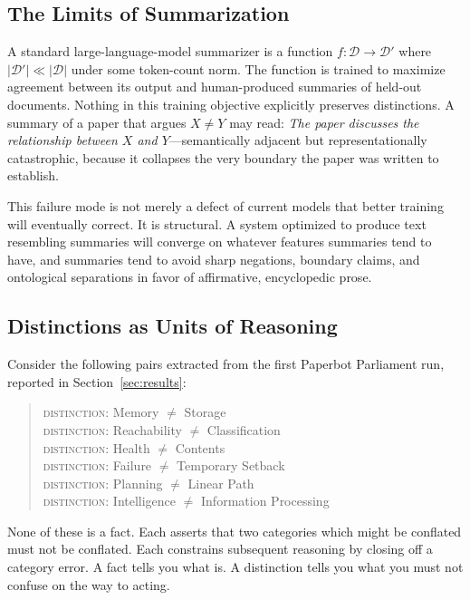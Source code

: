 \documentclass[12pt, a4paper]{article}
\theoremstyle{principle}
\theoremstyle{definition}
\begin{document}
\subsection{The Limits of Summarization}

A standard large-language-model summarizer is a function $f : \mathcal{D} \to
\mathcal{D}'$ where $|\mathcal{D}'| \ll |\mathcal{D}|$ under some token-count norm.
The function is trained to maximize agreement between its output and human-produced
summaries of held-out documents. Nothing in this training objective explicitly
preserves distinctions. A summary of a paper that argues $X \neq Y$ may read:
\emph{The paper discusses the relationship between $X$ and $Y$}---semantically
adjacent but representationally catastrophic, because it collapses the very boundary
the paper was written to establish.

This failure mode is not merely a defect of current models that better training will
eventually correct. It is structural. A system optimized to produce text resembling
summaries will converge on whatever features summaries tend to have, and summaries
tend to avoid sharp negations, boundary claims, and ontological separations in favor
of affirmative, encyclopedic prose.

\subsection{Distinctions as Units of Reasoning}

Consider the following pairs extracted from the first Paperbot Parliament run,
reported in Section~\ref{sec:results}:

\begin{quote}
\textsc{distinction}: Memory $\neq$ Storage\\
\textsc{distinction}: Reachability $\neq$ Classification\\
\textsc{distinction}: Health $\neq$ Contents\\
\textsc{distinction}: Failure $\neq$ Temporary Setback\\
\textsc{distinction}: Planning $\neq$ Linear Path\\
\textsc{distinction}: Intelligence $\neq$ Information Processing
\end{quote}

None of these is a fact. Each asserts that two categories which might be conflated
must not be conflated. Each constrains subsequent reasoning by closing off a category
error. A fact tells you what is. A distinction tells you what you must not confuse on
the way to acting.
\end{document}
